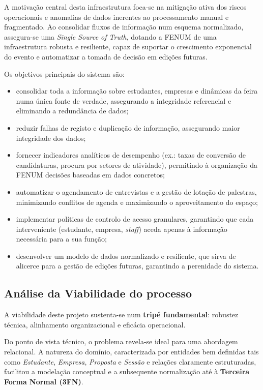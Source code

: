\documentclass[12pt,a4paper]{article}
\begin{document}
A motivação central desta infraestrutura foca-se na mitigação ativa dos riscos operacionais e anomalias de dados inerentes ao processamento manual e fragmentado. Ao consolidar fluxos de informação num esquema normalizado, assegura-se uma \textit{Single Source of Truth}, dotando a FENUM de uma infraestrutura robusta e resiliente, capaz de suportar o crescimento exponencial do evento e automatizar a tomada de decisão em edições futuras.

Os objetivos principais do sistema são:

\begin{itemize}[leftmargin=1.5cm]
    \item consolidar toda a informação sobre estudantes, empresas e dinâmicas da
    feira numa única fonte de verdade, assegurando a integridade referencial e
    eliminando a redundância de dados;
    \item reduzir falhas de registo e duplicação de informação, assegurando maior integridade dos dados;
    \item fornecer indicadores analíticos de desempenho (ex.: taxas de conversão
    de candidaturas, procura por setores de atividade), permitindo à organização
    da FENUM decisões baseadas em dados concretos;
    \item automatizar o agendamento de entrevistas e a gestão de lotação de
    palestras, minimizando conflitos de agenda e maximizando o aproveitamento do
    espaço;
    \item implementar políticas de controlo de acesso granulares, garantindo que
    cada interveniente (estudante, empresa, \textit{staff}) aceda apenas à
    informação necessária para a sua função;
    \item desenvolver um modelo de dados normalizado e resiliente, que sirva de
    alicerce para a gestão de edições futuras, garantindo a perenidade do
    sistema.
\end{itemize}

\subsection{Análise da Viabilidade do processo}

A viabilidade deste projeto sustenta-se num \textbf{tripé fundamental}: robustez
técnica, alinhamento organizacional e eficácia operacional.

Do ponto de vista técnico, o problema revela-se ideal para uma abordagem
relacional. A natureza do domínio, caracterizada por entidades bem definidas tais como \textit{Estudante}, \textit{Empresa}, \textit{Proposta} e \textit{Sessão} e relações claramente estruturadas, facilitou a modelação conceptual e a subsequente normalização até à \textbf{Terceira Forma Normal (3FN)}. 
\end{document}
